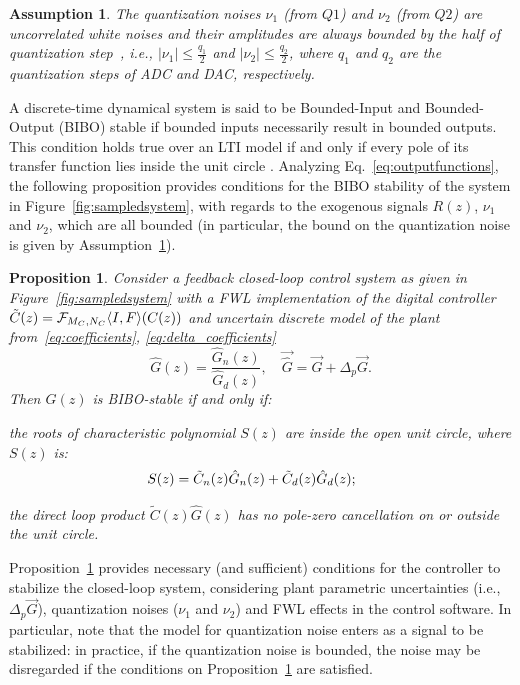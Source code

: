 \documentclass[final]{sig-alternate-05-2015}
\newtheorem{myassumption}{Assumption}
\newtheorem{myprop}{Proposition}
\begin{document}
\begin{myassumption}
\label{whitenoise}
%
The quantization noises $\nu_{1}$ (from $Q1$) and $\nu_{2}$ (from $Q2$) are
uncorrelated white noises and their amplitudes are always bounded by the
half of quantization step~\cite{astrom1997computer}, i.e., $\vert \nu_{1}
\vert \leq \frac{q_{1}}{2}$ and $\vert \nu_{2} \vert \leq \frac{q_{2}}{2}$,
where $q_{1}$ and $q_{2}$ are the quantization steps of ADC and DAC, respectively.
% 
\end{myassumption}

A discrete-time dynamical system is said to be Bounded-Input and
Bounded-Output (BIBO) stable if bounded inputs necessarily result in bounded
outputs.  This condition holds true over an LTI model if and only if every
pole of its transfer function lies inside the unit circle \cite{Astrom08}. 
Analyzing Eq.~\eqref{eq:outputfunctions}, the following proposition provides
conditions for the BIBO stability of the system in
Figure~\ref{fig:sampledsystem}, with regards to the exogenous signals
$R(z)$, $\nu_{1}$ and $\nu_{2}$, which are all bounded (in particular, the
bound on the quantization noise is given by Assumption~\ref{whitenoise}).
%
\begin{myprop}{\cite{Bessa16,fadali}}
\label{prop:eq_int_stab} 
%
Consider a feedback closed-loop control system as given in
Figure~\ref{fig:sampledsystem} with a FWL implementation of the digital
controller $\tilde{C}(z) =\mathcal{F}_{M_C,N_C}\langle{I},{F}\rangle(C(z))$ and
uncertain discrete model of the plant
from~\eqref{eq:coefficients}, \eqref{eq:delta_coefficients}
%
$$
\hat{G}(z) =\frac{\hat{G}_n(z)}{\hat{G}_d(z)}, \quad \vec{\hat{G}}=\vec{G}+\Delta_p \vec{G}.
$$
%
Then $\hat{G}(z)$ is BIBO-stable if and only if:
%
\begin{itemize*}
\item  the roots of characteristic polynomial $S(z)$ are inside the open unit circle, where $S(z)$ is:
\begin{equation}
\label{eq:internal_stab_lemma}
\hspace{-3ex} S(z)=\tilde{C}_n(z)\hat{G}_n(z)+\tilde{C}_d(z)\hat{G}_d(z);
\end{equation}
\item the direct loop product $\tilde{C}(z) \hat{G}(z)$ has no pole-zero cancellation on or outside the unit circle.
\end{itemize*}
\end{myprop}

Proposition~\ref{prop:eq_int_stab} provides necessary (and sufficient)
conditions for the controller to stabilize the closed-loop system,
considering plant parametric uncertainties (i.e., $\Delta_p \vec{G}$),
quantization noises ($\nu_{1}$ and $\nu_{2}$) and FWL effects in the control
software.  In particular, note that the model for quantization noise enters
as a signal to be stabilized: in practice, if the quantization noise is
bounded, the noise may be disregarded if the conditions on
Proposition~\ref{prop:eq_int_stab} are satisfied.
\end{document}
